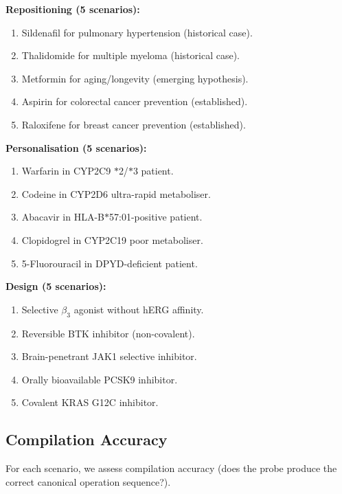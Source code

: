 \documentclass[11pt,twocolumn,a4paper]{article}
\theoremstyle{definition}
\theoremstyle{remark}
\begin{document}
\textbf{Repositioning (5 scenarios):}
\begin{enumerate}[nosep,label=R\arabic*.]
\item Sildenafil for pulmonary hypertension (historical case).
\item Thalidomide for multiple myeloma (historical case).
\item Metformin for aging/longevity (emerging hypothesis).
\item Aspirin for colorectal cancer prevention (established).
\item Raloxifene for breast cancer prevention (established).
\end{enumerate}

\textbf{Personalisation (5 scenarios):}
\begin{enumerate}[nosep,label=P\arabic*.]
\item Warfarin in CYP2C9 $\ast$2/$\ast$3 patient.
\item Codeine in CYP2D6 ultra-rapid metaboliser.
\item Abacavir in HLA-B$\ast$57:01-positive patient.
\item Clopidogrel in CYP2C19 poor metaboliser.
\item 5-Fluorouracil in DPYD-deficient patient.
\end{enumerate}

\textbf{Design (5 scenarios):}
\begin{enumerate}[nosep,label=G\arabic*.]
\item Selective $\beta_3$ agonist without hERG affinity.
\item Reversible BTK inhibitor (non-covalent).
\item Brain-penetrant JAK1 selective inhibitor.
\item Orally bioavailable PCSK9 inhibitor.
\item Covalent KRAS G12C inhibitor.
\end{enumerate}

\subsection{Compilation Accuracy}

For each scenario, we assess compilation accuracy (does the probe produce the correct canonical operation sequence?).
\end{document}
